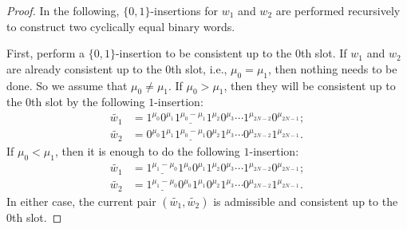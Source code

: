 \documentclass[10pt,a4paper]{amsart}
\begin{document}
\begin{proof}
    In the following, $\{0,1\}$-insertions for $w_1$ and $w_2$ are performed recursively to construct two cyclically equal binary words. 

    First, perform a $\{0,1\}$-insertion to be consistent up to the 0th slot. If $w_1$ and $w_2$ are already consistent up to the 0th slot, i.e., $\mu_0 = \mu_1$, then nothing needs to be done. So we assume that $\mu_0 \neq \mu_1$. 
    If $\mu_0 > \mu_1$, then they will be consistent up to the 0th slot by the following $1$-insertion:
    \[
        \begin{split}
            \widetilde{w_1} &= 1^{\mu_0} 0^{\mu_1} \underline{1^{\mu_0-\mu_1}} 1^{\mu_2} 0^{\mu_3} \cdots 1^{\mu_{2N-2}} 0^{\mu_{2N-1}}; \\
            \widetilde{w_2} &= 0^{\mu_0} 1^{\mu_1} \underline{1^{\mu_0-\mu_1}} 0^{\mu_2} 1^{\mu_3} \cdots 0^{\mu_{2N-2}} 1^{\mu_{2N-1}}.
        \end{split}
    \]
    If $\mu_0 < \mu_1$, then it is enough to do the following $1$-insertion:
    \[
        \begin{split}
            \widetilde{w_1} &= \underline{1^{\mu_1-\mu_0}} 1^{\mu_0} 0^{\mu_1} 1^{\mu_2} 0^{\mu_3} \cdots 1^{\mu_{2N-2}} 0^{\mu_{2N-1}}; \\
            \widetilde{w_2} &= \underline{1^{\mu_1-\mu_0}} 0^{\mu_0} 1^{\mu_1} 0^{\mu_2} 1^{\mu_3} \cdots 0^{\mu_{2N-2}} 1^{\mu_{2N-1}}.
        \end{split}
    \]
    In either case, the current pair $(\widetilde{w_1}, \widetilde{w_2})$ is admissible and consistent up to the 0th slot.


\end{proof}
\end{document}
